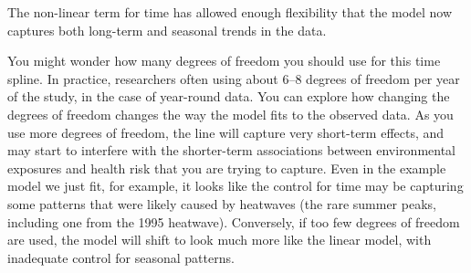 \documentclass[
]{book}
\newenvironment{Shaded}{\begin{snugshade}}{\end{snugshade}}
\newcommand{\AttributeTok}[1]{\textcolor[rgb]{0.13,0.29,0.53}{#1}}
\newcommand{\CommentTok}[1]{\textcolor[rgb]{0.56,0.35,0.01}{\textit{#1}}}
\newcommand{\DecValTok}[1]{\textcolor[rgb]{0.00,0.00,0.81}{#1}}
\newcommand{\FloatTok}[1]{\textcolor[rgb]{0.00,0.00,0.81}{#1}}
\newcommand{\FunctionTok}[1]{\textcolor[rgb]{0.13,0.29,0.53}{\textbf{#1}}}
\newcommand{\NormalTok}[1]{#1}
\newcommand{\OtherTok}[1]{\textcolor[rgb]{0.56,0.35,0.01}{#1}}
\newcommand{\SpecialCharTok}[1]{\textcolor[rgb]{0.81,0.36,0.00}{\textbf{#1}}}
\newcommand{\StringTok}[1]{\textcolor[rgb]{0.31,0.60,0.02}{#1}}
\begin{document}
The non-linear term for time has allowed enough flexibility that the model now
captures both long-term and seasonal trends in the data.

You might wonder how many degrees of freedom you should use for this time spline. In practice,
researchers often using about 6--8 degrees of freedom per year of the study, in
the case of year-round data. You can explore how changing the degrees of freedom
changes the way the model fits to the observed data. As you use more degrees of
freedom, the line will capture very short-term effects, and may start to
interfere with the shorter-term associations between environmental exposures and
health risk that you are trying to capture. Even in the example model we just
fit, for example, it looks like the control for time may be capturing some
patterns that were likely caused by heatwaves (the rare summer peaks, including
one from the 1995 heatwave). Conversely, if too few degrees of freedom are used,
the model will shift to look much more like the linear model, with inadequate
control for seasonal patterns.

\begin{Shaded}
\end{Shaded}
\end{document}
